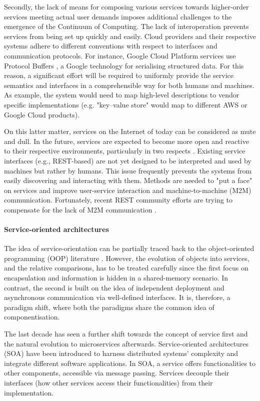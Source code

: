 \documentclass{ieeeaccess}
\begin{document}
Secondly, the lack of means for composing various services towards higher-order services meeting actual user demands imposes additional challenges to the emergence of the Continuum of Computing. The lack of interoperation prevents services from being set up quickly and easily. Cloud providers and their respective systems adhere to different conventions with respect to interfaces and communication protocols. For instance, Google Cloud Platform services use Protocol Buffers \cite{protobuf}, a Google technology for serialising structured data. For this reason, a significant effort will be required to uniformly provide the service semantics and interfaces in a comprehensible way for both humans and machines. As example, the system would need to map high-level descriptions to vendor specific implementations (e.g. "key–value store" would map to different AWS or Google Cloud products).

On this latter matter, services on the Internet of today can be considered as mute and dull. In the future, services are expected to become more open and reactive to their respective environments, particularly in two respects \cite{iot-enterprise}. Existing service interfaces (e.g., REST-based) are not yet designed to be interpreted and used by machines but rather by humans. This issue frequently prevents the systems from easily discovering and interacting with them. Methods are needed to "put a face" on services and improve user-service interaction and machine-to-machine (M2M) communication. Fortunately, recent REST community efforts are trying to compensate for the lack of M2M communication \cite{openapi}.

\paragraph{Service-oriented architectures}

The idea of service-orientation can be partially traced back to the object-oriented programming (OOP) literature \cite{microservices-today}. However, the evolution of objects into services, and the relative comparisons, has to be treated carefully since the first focus on encapsulation and information is hidden in a shared-memory scenario. In contrast, the second is built on the idea of independent deployment and asynchronous communication via well-defined interfaces. It is, therefore, a paradigm shift, where both the paradigms share the common idea of componentisation.

The last decade has seen a further shift towards the concept of service first and the natural evolution to microservices afterwards. Service-oriented architectures (SOA) have been introduced to harness distributed systems' complexity and integrate different software applications. In SOA, a service offers functionalities to other components, accessible via message passing. Services decouple their interfaces (how other services access their functionalities) from their implementation.
\end{document}
